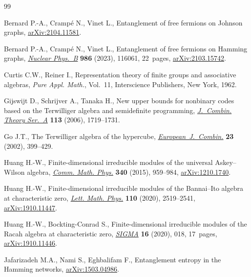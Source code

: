 \documentclass[pdftex]{sigma}%
\numberwithin{equation}{section}
\begin{document}
\begin{thebibliography}{99}
\footnotesize\itemsep=0pt

Bernard P.-A., Cramp\'e N., Vinet L., Entanglement of free fermions on Johnson
 graphs, \href{https://arxiv.org/abs/2104.11581}{arXiv:2104.11581}.

Bernard P.-A., Cramp\'e N., Vinet L., Entanglement of free fermions on {H}amming
 graphs, \href{https://doi.org/10.1016/j.nuclphysb.2022.116061}{\textit{Nuclear Phys.~B}} \textbf{986} (2023), 116061, 22~pages,
 \href{https://arxiv.org/abs/2103.15742}{arXiv:2103.15742}.

Curtis C.W., Reiner I., Representation theory of finite groups and associative
 algebras, \textit{Pure Appl. Math.}, Vol.~11, Interscience Publishers, New
 York, 1962.

Gijswijt D., Schrijver A., Tanaka H., New upper bounds for nonbinary codes
 based on the {T}erwilliger algebra and semidefinite programming,
 \href{https://doi.org/10.1016/j.jcta.2006.03.010}{\textit{J.~Combin. Theory Ser.~A}} \textbf{113} (2006), 1719--1731.

Go J.T., The {T}erwilliger algebra of the hypercube,
 \href{https://doi.org/10.1006/eujc.2000.0514}{\textit{European~J.~Combin.}} \textbf{23} (2002), 399--429.

Huang H.-W., Finite-dimensional irreducible modules of the universal
 {A}skey--{W}ilson algebra, \href{https://doi.org/10.1007/s00220-015-2467-9}{\textit{Comm. Math. Phys.}} \textbf{340} (2015),
 959--984, \href{https://arxiv.org/abs/1210.1740}{arXiv:1210.1740}.

Huang H.-W., Finite-dimensional irreducible modules of the {B}annai--{I}to
 algebra at characteristic zero, \href{https://doi.org/10.1007/s11005-020-01306-9}{\textit{Lett. Math. Phys.}} \textbf{110}
 (2020), 2519--2541, \href{https://arxiv.org/abs/1910.11447}{arXiv:1910.11447}.

Huang H.-W., Bockting-Conrad S., Finite-dimensional irreducible modules of the
 {R}acah algebra at characteristic zero, \href{https://doi.org/10.3842/SIGMA.2020.018}{\textit{SIGMA}} \textbf{16} (2020),
 018, 17~pages, \href{https://arxiv.org/abs/1910.11446}{arXiv:1910.11446}.

Jafarizadeh M.A., Nami S., Eghbalifam F., Entanglement entropy in the {H}amming
 networks, \href{https://arxiv.org/abs/1503.04986}{arXiv:1503.04986}.


\end{thebibliography}
\end{document}

